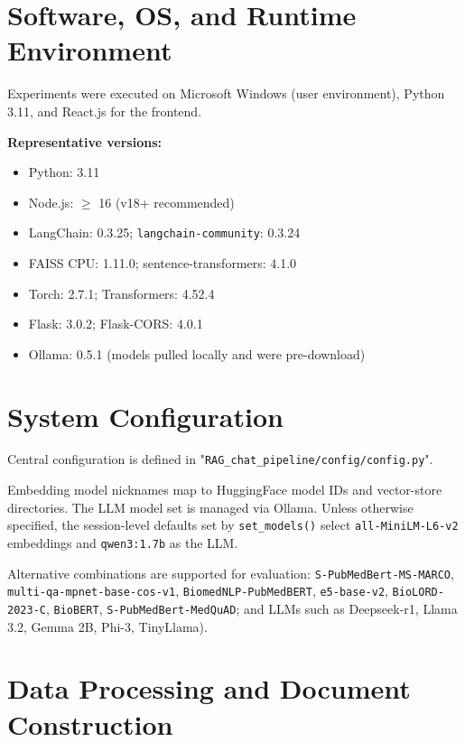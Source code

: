 \section{Software, OS, and Runtime Environment}
Experiments were executed on Microsoft Windows (user environment), Python 3.11, and React.js for the frontend.

\smallskip
\noindent\textbf{Representative versions:}
\begin{itemize}
  \item Python: 3.11
  \item Node.js: \(\ge\) 16 (v18+ recommended)
  \item LangChain: 0.3.25; \texttt{langchain-community}: 0.3.24
  \item FAISS CPU: 1.11.0; sentence-transformers: 4.1.0
  \item Torch: 2.7.1; Transformers: 4.52.4
  \item Flask: 3.0.2; Flask-CORS: 4.0.1
  \item Ollama: 0.5.1 (models pulled locally and were pre-download)
\end{itemize}

\section{System Configuration}
Central configuration is defined in "\texttt{RAG\_chat\_pipeline/config/config.py}".

\noindent Embedding model nicknames map to HuggingFace model IDs and vector-store directories. The LLM model set is managed via Ollama. Unless otherwise specified, the session-level defaults set by \texttt{set\_models()} select \texttt{all-MiniLM-L6-v2} embeddings and \texttt{qwen3:1.7b} as the LLM. 

Alternative combinations are supported for evaluation: \texttt{S-PubMedBert-MS-MARCO}, \newline \texttt{multi-qa-mpnet-base-cos-v1}, \texttt{BiomedNLP-PubMedBERT}, \texttt{e5-base-v2}, \texttt{BioLORD-2023-C}, \texttt{BioBERT}, \texttt{S-PubMedBert-MedQuAD}; and LLMs such as Deepseek-r1, Llama 3.2, Gemma 2B, Phi-3, TinyLlama).

\section{Data Processing and Document Construction}

